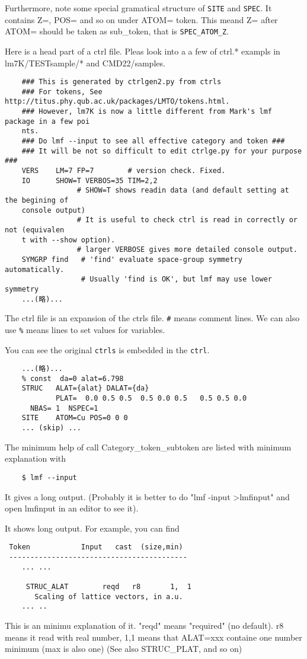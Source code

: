 \documentclass[a4paper,10pt,epsf,fleqn]{article}
\begin{document}
Furthermore, note some special gramatical structure of \verb+SITE+ and
\verb+SPEC+. It contains Z=, POS= and so on under ATOM= token. 
This meand Z= after ATOM= should be taken as sub\_token, that is \verb+SPEC_ATOM_Z+.


Here is a head part of a ctrl file. Pleas look into a a few of ctrl.*
exampls in lm7K/TESTsample/* and CMD22/samples.
\begin{verbatim}
    ### This is generated by ctrlgen2.py from ctrls 
    ### For tokens, See http://titus.phy.qub.ac.uk/packages/LMTO/tokens.html. 
    ### However, lm7K is now a little different from Mark's lmf package in a few poi
    nts.
    ### Do lmf --input to see all effective category and token ###
    ### It will be not so difficult to edit ctrlge.py for your purpose ###
    VERS    LM=7 FP=7        # version check. Fixed.
    IO      SHOW=T VERBOS=35 TIM=2,2
                 # SHOW=T shows readin data (and default setting at the begining of 
    console output)
                 # It is useful to check ctrl is read in correctly or not (equivalen
    t with --show option).
                 # larger VERBOSE gives more detailed console output.
    SYMGRP find   # 'find' evaluate space-group symmetry automatically.
                  # Usually 'find is OK', but lmf may use lower symmetry
    ...(略)...
\end{verbatim}
The ctrl file is an expansion of the ctrls file. 
\verb+#+ means comment lines. We can also use
\verb+%+ means lines to set values for variables.

You can see the original \verb+ctrls+ is embedded in the \verb+ctrl+.
\begin{verbatim}
    ...(略)...
    % const  da=0 alat=6.798
    STRUC   ALAT={alat} DALAT={da}
            PLAT=  0.0 0.5 0.5  0.5 0.0 0.5   0.5 0.5 0.0
      NBAS= 1  NSPEC=1
    SITE    ATOM=Cu POS=0 0 0
    ... (skip) ...
\end{verbatim}

The minimum help of call Category\_token\_subtoken are listed with
minimum explanation with 
\begin{verbatim}
    $ lmf --input
\end{verbatim}
It gives a long output. (Probably it is better to do "lmf -input >lmfinput"
and open lmfinput in an editor to see it).

It shows long output. For example, you can find
\begin{verbatim}
 Token            Input   cast  (size,min)
 ------------------------------------------
    ... ...

     STRUC_ALAT        reqd   r8       1,  1
       Scaling of lattice vectors, in a.u.
    ... ..
\end{verbatim}
This is an minimu explanation of it. "reqd" means "required" (no
default). r8 means it read with real number, 1,1 means
that ALAT=xxx containe one number minimum (max is also one)
(See also STRUC\_PLAT, and so on)
\end{document}
